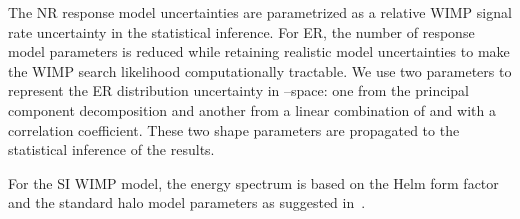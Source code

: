 \documentclass[
    reprint,
    superscriptaddress,
    aps, prl,
    amsmath,amssymb,
    twocolumn,
    showkeys,
    floatfix,
    nofootinbib,
]{revtex4-2}
\begin{document}
The NR response model uncertainties are parametrized as a relative WIMP signal rate uncertainty in the statistical inference.
For ER, the number of response model parameters is reduced while retaining realistic model uncertainties to make the WIMP search likelihood computationally tractable.
We use two parameters to represent the ER distribution uncertainty in \csone--\cstwo space: one from the principal component decomposition \cite{XENON:2024ap2} and another from a linear combination of \gone and \gtwo with a correlation coefficient.
These two shape parameters are propagated to the statistical inference of the results.

For the SI WIMP model, the energy spectrum is based on the Helm form factor~\cite{helm1956inelastic} and the standard halo model parameters as suggested in~\cite{Baxter:2021pqo}.
\end{document}
